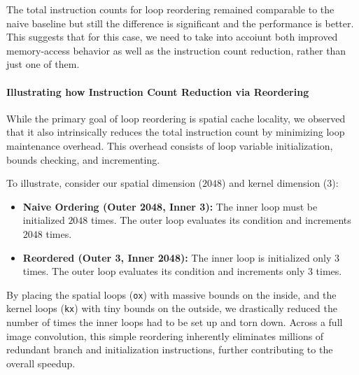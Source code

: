 The total instruction counts for loop reordering remained comparable to the naive baseline but still the difference is significant and the performance is better. This suggests that for this case, we need to take into accoiunt both improved memory-access behavior as well as the instruction count reduction, rather than just one of them. 

\paragraph{Illustrating how Instruction Count Reduction via Reordering}While the primary goal of loop reordering is spatial cache locality, we observed that it also intrinsically reduces the total instruction count by minimizing loop maintenance overhead. This overhead consists of loop variable initialization, bounds checking, and incrementing. 

To illustrate, consider our spatial dimension ($2048$) and kernel dimension ($3$):
\begin{itemize}
    \item \textbf{Naive Ordering (Outer 2048, Inner 3):} The inner loop must be initialized $2048$ times. The outer loop evaluates its condition and increments $2048$ times.
    \item \textbf{Reordered (Outer 3, Inner 2048):} The inner loop is initialized only $3$ times. The outer loop evaluates its condition and increments only $3$ times.
\end{itemize}

By placing the spatial loops (\texttt{ox}) with massive bounds on the inside, and the kernel loops (\texttt{kx}) with tiny bounds on the outside, we drastically reduced the number of times the inner loops had to be set up and torn down. Across a full image convolution, this simple reordering inherently eliminates millions of redundant branch and initialization instructions, further contributing to the overall speedup.

